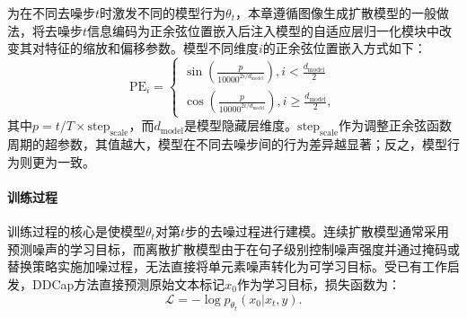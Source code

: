 为在不同去噪步$t$时激发不同的模型行为$\theta_t$，本章遵循图像生成扩散模型\cite{VQ-diffusion}的一般做法，将去噪步$t$信息编码为正余弦位置嵌入后注入模型的自适应层归一化模块\cite{adaln}中改变其对特征的缩放和偏移参数。模型不同维度$i$的正余弦位置嵌入方式如下：
\begin{equation}
    \text{PE}_{i} = \begin{cases}
    \sin(\frac{p}{10000^{2i/d_{\text{model}}}}), i < \frac{d_{\text{model}}}{2} \\
    \cos(\frac{p}{10000^{2i/d_{\text{model}}}}), i \ge \frac{d_{\text{model}}}{2},
    \end{cases}
    \label{eq:ddcap-t}
\end{equation}
其中$p = t/T\times \text{step}_{\text{scale}}$，而$d_{\text{model}}$是模型隐藏层维度。$\text{step}_{\text{scale}}$作为调整正余弦函数周期的超参数，其值越大，模型在不同去噪步间的行为差异越显著；反之，模型行为则更为一致。

\paragraph{训练过程} 训练过程的核心是使模型$\theta_t$对第$t$步的去噪过程进行建模。连续扩散模型通常采用预测噪声的学习目标，而离散扩散模型由于在句子级别控制噪声强度并通过掩码或替换策略实施加噪过程，无法直接将单元素噪声转化为可学习目标。受已有工作\cite{structddm}启发，DDCap方法直接预测原始文本标记$x_{0}$作为学习目标，损失函数为：
\begin{equation}
\mathcal{L}=-\log p_{\theta_t}(x_0 | x_t, y).
\end{equation}

